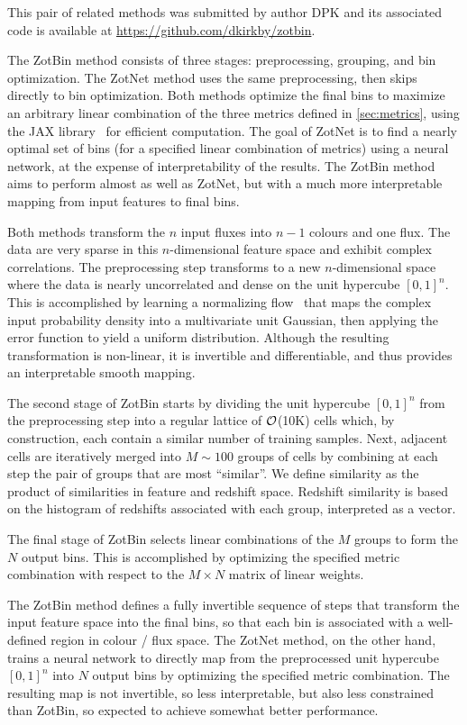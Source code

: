 \documentclass[twocolumn,twocolappendix]{aastex63}
\begin{document}
This pair of related methods was submitted by author DPK and its associated code is available at
\url{https://github.com/dkirkby/zotbin}.

The ZotBin method consists of three stages: preprocessing, grouping, and bin optimization.  The ZotNet method
uses the same preprocessing, then skips directly to bin optimization.  Both methods optimize the final bins to
maximize an arbitrary linear combination of the three metrics defined in \ref{sec:metrics}, using the JAX
library~\cite{jax} for efficient computation. The goal of ZotNet is to find a nearly optimal set of bins (for
a specified linear combination of metrics) using a neural network, at the expense of interpretability of the
results.  The ZotBin method aims to perform almost as well as ZotNet, but with a much more interpretable mapping
from input features to final bins.

Both methods transform the $n$ input fluxes into $n-1$ colours and one flux. The data are very sparse in this
$n$-dimensional feature space and exhibit complex correlations. The preprocessing step transforms to a new
$n$-dimensional space where the data is nearly uncorrelated and dense on the unit hypercube $[0,1]^n$. This is accomplished
by learning a normalizing flow~\cite{2019arXiv191202762P} that maps the complex input probability density
into a multivariate unit Gaussian, then applying the error function to yield a uniform distribution. Although
the resulting transformation is non-linear, it is invertible and differentiable, and thus provides an interpretable
smooth mapping.

The second stage of ZotBin starts by dividing the unit hypercube $[0,1]^n$ from the preprocessing step
into a regular lattice of ${\cal O}$(10K) cells which, by construction, each contain a similar number
of training samples.  Next, adjacent cells are iteratively merged into $M \sim 100$ groups of cells by
combining at each step the pair of groups that are most ``similar''.  We define similarity as the product
of similarities in feature and redshift space.  Redshift similarity is based on the histogram of redshifts
associated with each group, interpreted as a vector.

The final stage of ZotBin selects linear combinations of the $M$ groups to form the $N$ output bins. This is
accomplished by optimizing the specified metric combination with respect to the $M\times N$ matrix of linear
weights.

The ZotBin method defines a fully invertible sequence of steps that transform the input feature space into
the final bins, so that each bin is associated with a well-defined region in colour / flux space. The ZotNet method,
on the other hand, trains a neural network to directly map from the preprocessed unit hypercube $[0,1]^n$ into
$N$ output bins by optimizing the specified metric combination. The resulting map is not invertible, so less
interpretable, but also less constrained than ZotBin, so expected to achieve somewhat better performance.
\end{document}
